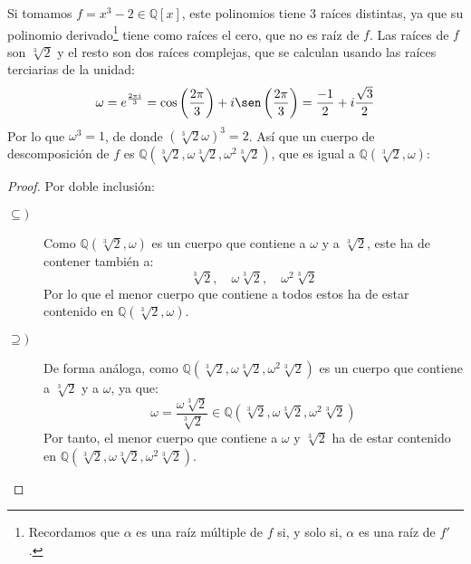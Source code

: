\begin{ejemplo}
    Si tomamos $f=x^3-2\in \mathbb{Q}[x]$, este polinomios tiene 3 raíces distintas, ya que su polinomio derivado\footnote{Recordamos que $\alpha$ es una raíz múltiple de $f$ si, y solo si, $\alpha$ es una raíz de $f'$.} tiene como raíces el cero, que no es raíz de $f$. Las raíces de $f$ son $\sqrt[3]{2}$ y el resto son dos raíces complejas, que se calculan usando las raíces terciarias de la unidad:
    \begin{equation*}
        \omega = e^{\frac{2\pi i}{3}} = \cos\left(\frac{2\pi}{3}\right) + i\sen\left(\frac{2\pi}{3}\right) = \dfrac{-1}{2} + i \dfrac{\sqrt{3}}{2}
    \end{equation*}
    Por lo que $\omega^3 = 1$, de donde ${\left(\sqrt[3]{2}\omega\right)}^{3} = 2$. Así que un cuerpo de descomposición de $f$ es $\mathbb{Q}\left(\sqrt[3]{2}, \omega\sqrt[3]{2}, \omega^2\sqrt[3]{2}\right)$, que es igual a $\mathbb{Q}\left(\sqrt[3]{2},\omega\right)$:
    \begin{proof}
        Por doble inclusión:
        \begin{description}
            \item [$\subseteq )$] Como $\mathbb{Q}\left(\sqrt[3]{2}, \omega\right)$ es un cuerpo que contiene a $\omega$ y a $\sqrt[3]{2}$, este ha de contener también a:
                \begin{equation*}
                    \sqrt[3]{2}, \quad \omega\sqrt[3]{2}, \quad \omega^2 \sqrt[3]{2}
                \end{equation*}
                Por lo que el menor cuerpo que contiene a todos estos ha de estar contenido en $\mathbb{Q}\left(\sqrt[3]{2}, \omega\right)$.
            \item [$\supseteq )$] De forma análoga, como $\mathbb{Q}\left(\sqrt[3]{2}, \omega\sqrt[3]{2}, \omega^2\sqrt[3]{2}\right)$ es un cuerpo que contiene a $\sqrt[3]{2}$ y a $\omega$, ya que:
                \begin{equation*}
                    \omega = \dfrac{\omega \sqrt[3]{2}}{\sqrt[3]{2}} \in \mathbb{Q}\left(\sqrt[3]{2}, \omega\sqrt[3]{2}, \omega^2\sqrt[3]{2}\right)
                \end{equation*}
                Por tanto, el menor cuerpo que contiene a $\omega$ y $\sqrt[3]{2}$ ha de estar contenido en $\mathbb{Q}\left(\sqrt[3]{2}, \omega\sqrt[3]{2}, \omega^2\sqrt[3]{2}\right)$.
        \end{description}
    \end{proof}
\end{ejemplo}

